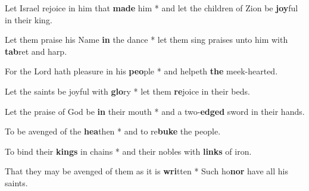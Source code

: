 \begin{multicols}{2}
	Let Israel rejoice in him that \textbf{made} him * and let the children of Zion be \textbf{joy}ful in their king.
	
	Let them praise his Name \textbf{in} the dance * let them sing praises unto him with \textbf{tab}ret and harp.
	
	For the Lord hath pleasure in his \textbf{peo}ple * and helpeth \textbf{the} meek-hearted.
	
	Let the saints be joyful with \textbf{glo}ry * let them \textbf{re}joice in their beds.
	
	Let the praise of God be \textbf{in} their mouth * and a two-\textbf{edged} sword in their hands.
	
	To be avenged of the \textbf{hea}then * and to re\textbf{buke} the people.
	
	To bind their \textbf{kings} in chains * and their nobles with \textbf{links} of iron.
	
	That they may be avenged of them as it is \textbf{wri}tten * Such ho\textbf{nor} have all his saints.
\end{multicols}